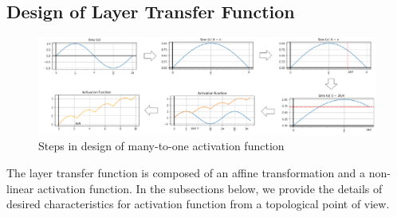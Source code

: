 \documentclass{bmvc2k}
\begin{document}

\subsection{Design of Layer Transfer Function}
\begin{figure}
    \centering
    \includegraphics[width=.9\linewidth]{images/figure7.png}
        \vspace{.1in}
    \caption{Steps in design of many-to-one activation function}
    \label{figure11}
    \end{figure}

The layer transfer function is composed of an affine transformation and a non-linear activation function.
In the subsections below, we provide the details of desired characteristics for activation function from a topological point of view.
\end{document}
